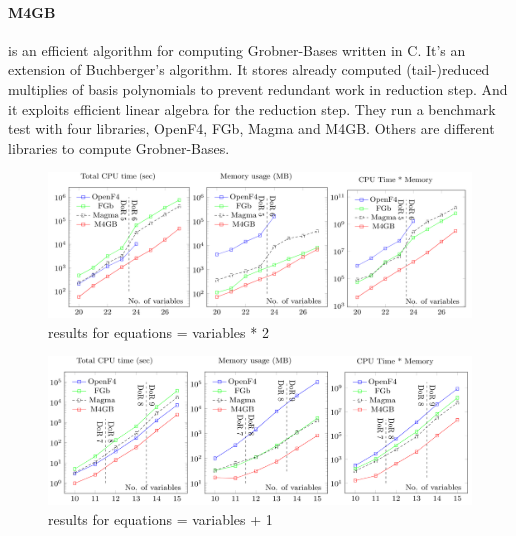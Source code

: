\documentclass[11pt]{article}
\begin{document}
\paragraph{M4GB}\cite{m4gbarticle}
is an  efficient algorithm for computing Grobner-Bases written in C. It's an extension of Buchberger’s algorithm. It stores already computed (tail-)reduced multiplies of basis polynomials to prevent redundant work in reduction step. And it exploits efficient linear algebra for the reduction step.
They run a benchmark test with four libraries, OpenF4, FGb, Magma and M4GB. Others are different libraries to compute Grobner-Bases.
\begin{figure}[H]
  \begin{center}
    \includegraphics[width=\linewidth]{m4gb_m_2n.png}
    \caption{results for equations = variables * 2}
    \label{fig:m4gb_m_2n}
  \end{center}
\end{figure}

\begin{figure}[H]
  \begin{center}
    \includegraphics[width=\linewidth]{m4gb_m_n_1.png}
    \caption{results for equations = variables + 1}
    \label{fig:m4gb_m_n_1}
  \end{center}
\end{figure}
\end{document}
